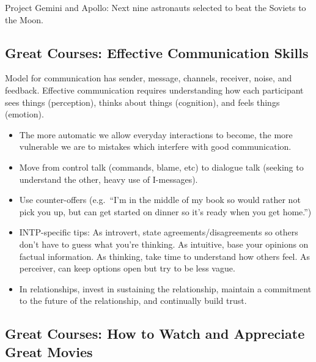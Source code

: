 \documentclass[
]{article}
\begin{document}
Project Gemini and Apollo: Next nine astronauts selected to beat the
Soviets to the Moon.

\hypertarget{great-courses-effective-communication-skills}{%
\subsection{Great Courses: Effective Communication
Skills}\label{great-courses-effective-communication-skills}}

Model for communication has sender, message, channels, receiver, noise,
and feedback. Effective communication requires understanding how each
participant sees things (perception), thinks about things (cognition),
and feels things (emotion).

\begin{itemize}
\item
  The more automatic we allow everyday interactions to become, the more
  vulnerable we are to mistakes which interfere with good communication.
\item
  Move from control talk (commands, blame, etc) to dialogue talk
  (seeking to understand the other, heavy use of I-messages).
\item
  Use counter-offers (e.g.~``I'm in the middle of my book so would
  rather not pick you up, but can get started on dinner so it's ready
  when you get home.'')
\item
  INTP-specific tips: As introvert, state agreements/disagreements so
  others don't have to guess what you're thinking. As intuitive, base
  your opinions on factual information. As thinking, take time to
  understand how others feel. As perceiver, can keep options open but
  try to be less vague.
\item
  In relationships, invest in sustaining the relationship, maintain a
  commitment to the future of the relationship, and continually build
  trust.
\end{itemize}

\hypertarget{great-courses-how-to-watch-and-appreciate-great-movies}{%
\subsection{Great Courses: How to Watch and Appreciate Great
Movies}\label{great-courses-how-to-watch-and-appreciate-great-movies}}
\end{document}
